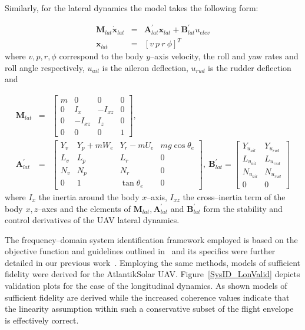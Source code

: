 Similarly, for the lateral dynamics the model takes the following form:

\small
\begin{eqnarray}\label{LAT_DYN}
 \mathbf{M}_{lat}\dot{\mathbf{x}}_{lat} &=& \mathbf{A}^\prime_{lat}\mathbf{x}_{lat}+\mathbf{B}^\prime_{lat}u_{elev} \\ \nonumber
 \mathbf{x}_{lat} &=& \left[v~p~r~\phi \right]^T
\end{eqnarray}
\normalsize
where $v,p,r,\phi$ correspond to the body $y$--axis velocity, the roll and yaw rates and roll angle respectively, $u_{ail}$ is the aileron deflection, $u_{rud}$ is the rudder deflection and

\footnotesize
\begin{eqnarray}
\mathbf{M}_{lat} &=& \begin{bmatrix}
m & 0 & 0 & 0\\ 
0 & I_x & -I_{xz} & 0\\ 
0 & -I_{xz} & I_z & 0\\ 
0 & 0 & 0 & 1
\end{bmatrix},\\ \nonumber 
\mathbf{A}^\prime_{lat} &=& \begin{bmatrix}

Y_v & Y_p + mW_e & Y_r-mU_e & mg\cos\theta_e\\ 
L_v & L_p & L_r & 0\\ 
N_v & N_p & N_r & 0 \\ 
0 & 1 & \tan\theta_e & 0
\end{bmatrix},~ \mathbf{B}^\prime_{lat} = \begin{bmatrix}
Y_{u_{ail}} & Y_{u_{rud}}\\ 
L_{u_{ail}} & L_{u_{rud}}\\ 
N_{u_{ail}} & N_{u_{rud}}\\ 
0 & 0
\end{bmatrix}
\end{eqnarray}
\normalsize
where $I_x$ the inertia around the body $x$--axis, $I_{xz}$ the cross--inertia term of the body $x,z$--axes and the elements of $\mathbf{M}_{lat},\mathbf{A}^\prime_{lat}$ and $\mathbf{B}^\prime_{lat}$ form the stability and control derivatives of the UAV lateral dynamics. 

The frequency--domain system identification framework employed is based on the objective function and guidelines outlined in~\cite{TISCHLER_BOOK} and its specifics were further detailed in our previous work~\cite{OMLAS_MED_14}. Employing the same methods, models of sufficient fidelity were derived for the AtlantikSolar UAV. Figure~\ref{SysID_LonValid} depicts validation plots for the case of the longitudinal dynamics. As shown models of sufficient fidelity are derived while the increased coherence values indicate that the linearity assumption within such a conservative subset of the flight envelope is effectively correct. 

